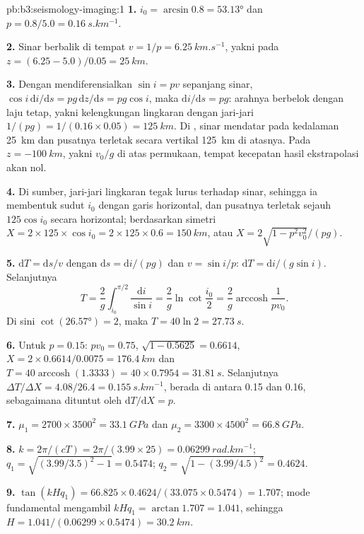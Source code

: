 \begin{solution}{pb:b3:seismology-imaging:1}
\textbf{1.} $i_0 = \arcsin 0.8 = \ang{53.13}$ dan $p = 0.8/5.0 =
\qty{0.16}{s.km^{-1}}$.

\textbf{2.} Sinar berbalik di tempat $v = 1/p = \qty{6.25}{km.s^{-1}}$, yakni pada
$z = (6.25 - 5.0)/0.05 = \qty{25}{km}$.

\textbf{3.} Dengan mendiferensialkan $\sin i = pv$ sepanjang sinar, $\cos i\,\mathrm di/
\mathrm ds = pg\,\mathrm dz/\mathrm ds = pg\cos i$, maka $\mathrm di/\mathrm ds =
pg$: arahnya berbelok dengan laju tetap, yakni kelengkungan lingkaran dengan jari-jari
$1/(pg) = 1/(0.16\times0.05) = \qty{125}{km}$. Di , sinar
mendatar pada kedalaman \qty{25}{km} dan pusatnya terletak secara vertikal \qty{125}{km}
di atasnya. Pada $z = \qty{-100}{km}$, yakni $v_0/g$ di atas permukaan, tempat
kecepatan hasil ekstrapolasi akan nol.

\textbf{4.} Di sumber, jari-jari lingkaran tegak lurus terhadap sinar,
sehingga ia membentuk sudut $i_0$ dengan garis horizontal, dan pusatnya terletak
sejauh $125\cos i_0$ secara horizontal; berdasarkan simetri
$X = 2\times125\times\cos i_0 = 2\times125\times0.6 = \qty{150}{km}$, atau
$X = 2\sqrt{1 - p^2v_0^2}/(pg)$.

\textbf{5.} $\mathrm dT = \mathrm ds/v$ dengan $\mathrm ds = \mathrm di/(pg)$ dan
$v = \sin i/p$: $\mathrm dT = \mathrm di/(g\sin i)$. Selanjutnya
\[
  T = \frac2g\int_{i_0}^{\pi/2}\frac{\mathrm di}{\sin i} = \frac2g\ln\cot\frac{i_0}2 =
  \frac2g\operatorname{arccosh}\frac1{pv_0} .
\]
Di sini $\cot(\ang{26.57}) = 2$, maka
$T = 40\ln2 = \qty{27.73}{s}$.

\textbf{6.} Untuk $p = 0.15$: $pv_0 = 0.75$, $\sqrt{1 - 0.5625} = 0.6614$,
$X = 2\times0.6614/0.0075 = \qty{176.4}{km}$ dan $T = 40\operatorname{arccosh}
(1.3333) = 40\times0.7954 = \qty{31.81}{s}$. Selanjutnya $\Delta T/\Delta X =
4.08/26.4 = \qty{0.155}{s.km^{-1}}$, berada di antara 0.15 dan 0.16, sebagaimana
dituntut oleh $\mathrm dT/\mathrm dX = p$.

\textbf{7.} $\mu_1 = 2700\times3500^2 = \qty{33.1}{GPa}$ dan
$\mu_2 = 3300\times4500^2 = \qty{66.8}{GPa}$.

\textbf{8.} $k = 2\pi/(cT) = 2\pi/(3.99\times25) = \qty{0.06299}{rad.km^{-1}}$;
$q_1 = \sqrt{(3.99/3.5)^2 - 1} = 0.5474$; $q_2 = \sqrt{1 - (3.99/4.5)^2} = 0.4624$.

\textbf{9.} $\tan(kHq_1) = 66.825\times0.4624/(33.075\times0.5474) = 1.707$; mode fundamental
mengambil $kHq_1 = \arctan1.707 = 1.041$, sehingga
$H = 1.041/(0.06299\times0.5474) = \qty{30.2}{km}$.


\end{solution}
